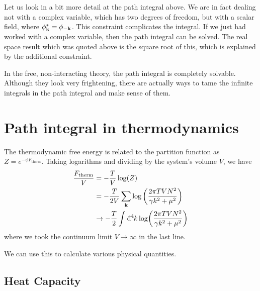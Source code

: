 Let us look in a bit more detail at the path integral above.
We are in fact dealing not with a complex variable, which has two degrees of freedom, but with a scalar field, where $\phi^*_{\vb{k}} = \phi_{-\vb{k}}$.
This constraint complicates the integral.
If we just had worked with a complex variable, then the path integral can be solved. The real space result which was quoted above is the square root of this, which is explained by the additional constraint.

In the free, non-interacting theory, the path integral is completely solvable. Although they look very frightening, there are actually ways to tame the infinite integrals in the path integral and make sense of them.

\section{Path integral in thermodynamics}%

The thermodynamic free energy is related to the partition function as $Z = e^{-\phi F_{\text{therm}}}$. Taking logarithms and dividing by the system's volume $V$, we have
\begin{align}
  \frac{F_{\text{therm}}}{V} &= -\frac{T}{V} \log(Z) \\
			       &= -\frac{T}{2V} \sum_{\vb{k}} \log \left( \frac{2\pi T V N^2}{\gamma k^2 + \mu^2} \right) \\
			       &\rightarrow -\frac{T}{2} \int_{}^{} \bdd[4]{k} \log(\frac{2\pi T V N^2}{\gamma k^2 + \mu^2})
\end{align}
where we took the continuum limit $V \to \infty$ in the last line.

We can use this to calculate various physical quantities.

\subsection{Heat Capacity}%
\label{sub:heat_capacity}


